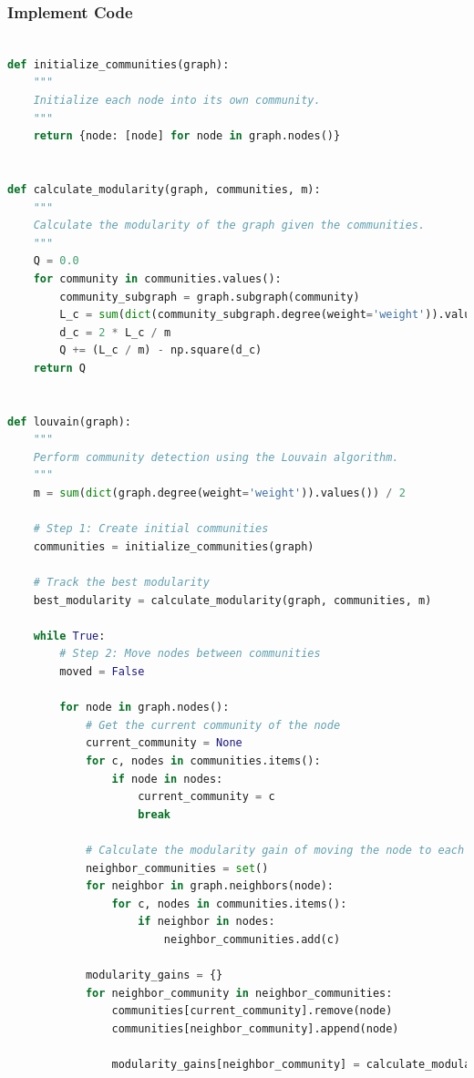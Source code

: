 \subsubsection{Implement Code}
\begin{lstlisting}[language=Python]

def initialize_communities(graph):
    """
    Initialize each node into its own community.
    """
    return {node: [node] for node in graph.nodes()}


def calculate_modularity(graph, communities, m):
    """
    Calculate the modularity of the graph given the communities.
    """
    Q = 0.0
    for community in communities.values():
        community_subgraph = graph.subgraph(community)
        L_c = sum(dict(community_subgraph.degree(weight='weight')).values())
        d_c = 2 * L_c / m
        Q += (L_c / m) - np.square(d_c)
    return Q


def louvain(graph):
    """
    Perform community detection using the Louvain algorithm.
    """
    m = sum(dict(graph.degree(weight='weight')).values()) / 2

    # Step 1: Create initial communities
    communities = initialize_communities(graph)

    # Track the best modularity
    best_modularity = calculate_modularity(graph, communities, m)

    while True:
        # Step 2: Move nodes between communities
        moved = False

        for node in graph.nodes():
            # Get the current community of the node
            current_community = None
            for c, nodes in communities.items():
                if node in nodes:
                    current_community = c
                    break

            # Calculate the modularity gain of moving the node to each neighboring community
            neighbor_communities = set()
            for neighbor in graph.neighbors(node):
                for c, nodes in communities.items():
                    if neighbor in nodes:
                        neighbor_communities.add(c)

            modularity_gains = {}
            for neighbor_community in neighbor_communities:
                communities[current_community].remove(node)
                communities[neighbor_community].append(node)

                modularity_gains[neighbor_community] = calculate_modularity(graph, communities, m)


\end{lstlisting}
